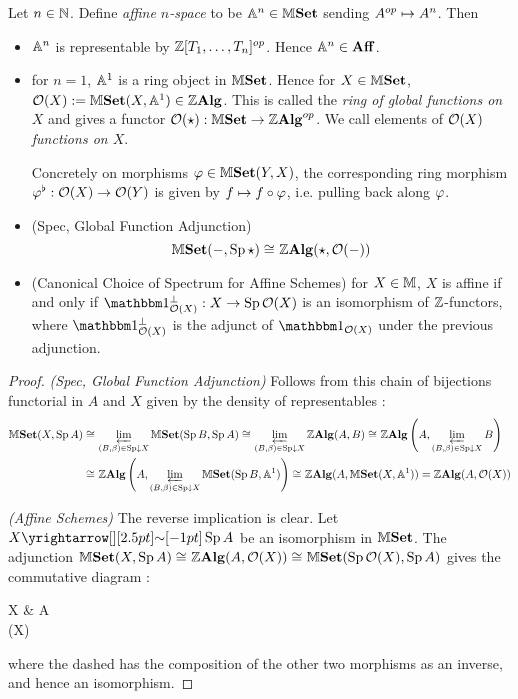 \documentclass[../main.tex]{subfiles}
\begin{document}
\begin{prop}
  
  Let $n \in \mathbb{N}$.
  Define \emph{affine $n$-space} to be $\mathbb{A}^n \in \mathbb{M}\mathbf{Set}$
  sending $A^{op} \mapsto A^n$.
  Then
  \begin{itemize}
    \item $\mathbb{A}^n$ is representable by $\mathbb{Z}[T_1,\dots,T_n]^{op}$.
    Hence $\mathbb{A}^n \in \mathbf{Aff}$.
    \item for $n = 1$, $\mathbb{A}^1$ is a ring object in $\mathbb{M}\mathbf{Set}$.
    Hence for $X \in \mathbb{M}\mathbf{Set}$,
    $\mathcal{O}(X) := \mathbb{M}\mathbf{Set}(X,\mathbb{A}^1) \in \mathbb{Z}\mathbf{Alg}$. 
    This is called the \emph{ring of global functions on $X$} and gives 
    a functor $\mathcal{O}(\star) : \mathbb{M}\mathbf{Set} \to \mathbb{Z}\mathbf{Alg}^{op}$.
    We call elements of $\mathcal{O}(X)$ \emph{functions on $X$}.

    Concretely on morphisms $\varphi \in \mathbb{M}\mathbf{Set}(Y,X)$,
    the corresponding ring morphism $\varphi^\flat : \mathcal{O}(X) \to \mathcal{O}(Y)$
    is given by $f \mapsto f \circ \varphi$, i.e. 
    pulling back along $\varphi$.
    
    \item (Spec, Global Function Adjunction)
    \[
      \mathbb{M}\mathbf{Set}(-,\operatorname{Sp} \star) \cong_{} \mathbb{Z}\mathbf{Alg}(\star,\mathcal{O}(-))
    \]
    \item (Canonical Choice of Spectrum for Affine Schemes) for $X \in \mathbb{M}$, 
    $X$ is affine if and only if $\id{\OO(X)}^\bot : X \to \SP \OO(X)$ 
    is an isomorphism of $\mathbb{Z}$-functors,
    where $\id{\OO(X)}^\bot$ is the adjunct of $\id{\OO(X)}$ under the 
    previous adjunction.
  \end{itemize}
\end{prop}
\begin{proof}
  \textit{(Spec, Global Function Adjunction)}
  Follows from this chain of bijections functorial in $A$ and $X$ 
  given by the density of representables :
  \begin{align*}
    \mathbb{M}\mathbf{Set}(X,\operatorname{Sp} A) 
    &\cong_{}  \varprojlim_{(B,\beta) \in \operatorname{Sp}\downarrow X} \mathbb{M}\mathbf{Set}(\operatorname{Sp} B,\operatorname{Sp} A) 
    \cong_{} \varprojlim_{(B,\beta) \in \operatorname{Sp}\downarrow X} \mathbb{Z}\mathbf{Alg}(A,B) 
    \cong_{} \mathbb{Z}\mathbf{Alg}\left(A,\varprojlim_{(B,\beta) \in \operatorname{Sp}\downarrow X} B\right) \\
    &\cong_{} \mathbb{Z}\mathbf{Alg}\left(A,\varprojlim_{(B,\beta) \in \operatorname{Sp}\downarrow X} \mathbb{M}\mathbf{Set}(\operatorname{Sp} B,\mathbb{A}^1)\right) 
    \cong_{} \mathbb{Z}\mathbf{Alg}(A,\mathbb{M}\mathbf{Set}(X,\mathbb{A}^1)) = \mathbb{Z}\mathbf{Alg}(A,\mathcal{O}(X))
  \end{align*}

  \textit{(Affine Schemes)}
  The reverse implication is clear.
  Let $X \map{\sim}{} \SP A$ be an isomorphism in $\mathbb{M}\mathbf{Set}$.
  The adjunction $\mathbb{M}\mathbf{Set}(X,\operatorname{Sp} A) \cong_{} \mathbb{Z}\mathbf{Alg}(A,\mathcal{O}(X)) 
  \cong_{} \mathbb{M}\mathbf{Set}(\operatorname{Sp} \mathcal{O}(X),\operatorname{Sp} A)$ gives the commutative diagram : 
  \begin{cd}
    X \ar[r,"\sim"] \ar[d] & \SP A \\
    \SP \OO(X) \ar[ru,dashed]
  \end{cd}
  where the dashed has the composition of the other two morphisms 
  as an inverse, and hence an isomorphism.
  
\end{proof}
\end{document}
